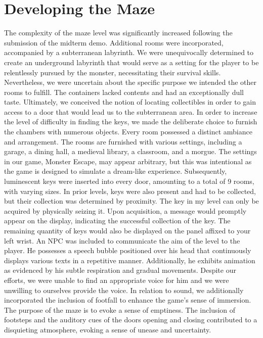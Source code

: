 \documentclass{vgtc}                          %
\begin{document}
\section{Developing the Maze}
The complexity of the maze level was significantly increased following the submission of the midterm demo. Additional rooms were incorporated, accompanied by a subterranean labyrinth. We were unequivocally determined to create an underground labyrinth that would serve as a setting for the player to be relentlessly pursued by the monster, necessitating their survival skills. Nevertheless, we were uncertain about the specific purpose we intended the other rooms to fulfill. The containers lacked contents and had an exceptionally dull taste. Ultimately, we conceived the notion of locating collectibles in order to gain access to a door that would lead us to the subterranean area. In order to increase the level of difficulty in finding the keys, we made the deliberate choice to furnish the chambers with numerous objects. Every room possessed a distinct ambiance and arrangement. The rooms are furnished with various settings, including a garage, a dining hall, a medieval library, a classroom, and a morgue. The settings in our game, Monster Escape, may appear arbitrary, but this was intentional as the game is designed to simulate a dream-like experience. Subsequently, luminescent keys were inserted into every door, amounting to a total of 9 rooms, with varying sizes. In prior levels, keys were also present and had to be collected, but their collection was determined by proximity. The key in my level can only be acquired by physically seizing it. Upon acquisition, a message would promptly appear on the display, indicating the successful collection of the key. The remaining quantity of keys would also be displayed on the panel affixed to your left wrist. An NPC was included to communicate the aim of the level to the player. He possesses a speech bubble positioned over his head that continuously displays various texts in a repetitive manner. Additionally, he exhibits animation as evidenced by his subtle respiration and gradual movements. Despite our efforts, we were unable to find an appropriate voice for him and we were unwilling to ourselves provide the voice. In relation to sound, we additionally incorporated the inclusion of footfall to enhance the game's sense of immersion. The purpose of the maze is to evoke a sense of emptiness. The inclusion of footsteps and the auditory cues of the doors opening and closing contributed to a disquieting atmosphere, evoking a sense of unease and uncertainty.
\end{document}
